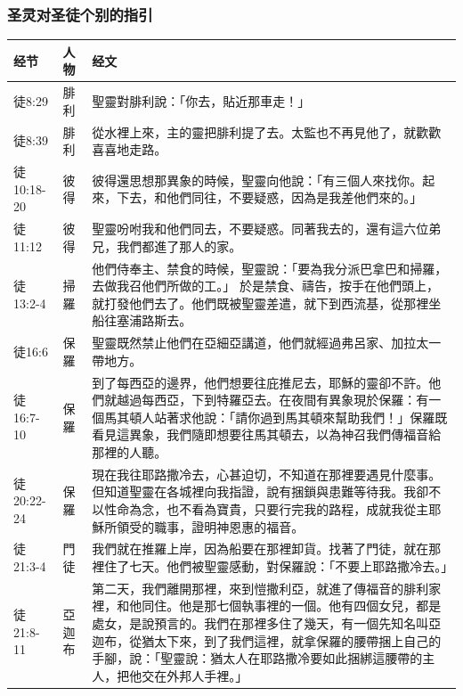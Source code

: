 \subsubsection{圣灵对圣徒个别的指引}
\begin{table}[H]
\centering
\begin{tabular}{p{5em}p{2.4em}p{40em}}  \toprule
经节&人物&经文 \\  \midrule
徒8:29&腓利&聖靈對腓利說：「你去，貼近那車走！」\\  \midrule
徒8:39&腓利&從水裡上來，主的靈把腓利提了去。太監也不再見他了，就歡歡喜喜地走路。\\  \midrule
徒10:18-20&彼得&彼得還思想那異象的時候，聖靈向他說：「有三個人來找你。起來，下去，和他們同往，不要疑惑，因為是我差他們來的。」\\  \midrule
徒11:12&彼得&聖靈吩咐我和他們同去，不要疑惑。同著我去的，還有這六位弟兄，我們都進了那人的家。\\  \midrule

徒13:2-4&掃羅&他們侍奉主、禁食的時候，聖靈說：「要為我分派巴拿巴和掃羅，去做我召他們所做的工。」 於是禁食、禱告，按手在他們頭上，就打發他們去了。他們既被聖靈差遣，就下到西流基，從那裡坐船往塞浦路斯去。\\  \midrule


徒16:6&保羅&聖靈既然禁止他們在亞細亞講道，他們就經過弗呂家、加拉太一帶地方。\\  \midrule
徒16:7-10&保羅&到了每西亞的邊界，他們想要往庇推尼去，耶穌的靈卻不許。他們就越過每西亞，下到特羅亞去。在夜間有異象現於保羅：有一個馬其頓人站著求他說：「請你過到馬其頓來幫助我們！」保羅既看見這異象，我們隨即想要往馬其頓去，以為神召我們傳福音給那裡的人聽。\\  \midrule


徒20:22-24&保羅&現在我往耶路撒冷去，心甚迫切，不知道在那裡要遇見什麼事。但知道聖靈在各城裡向我指證，說有捆鎖與患難等待我。我卻不以性命為念，也不看為寶貴，只要行完我的路程，成就我從主耶穌所領受的職事，證明神恩惠的福音。\\  \midrule
徒21:3-4&門徒&我們就在推羅上岸，因為船要在那裡卸貨。找著了門徒，就在那裡住了七天。他們被聖靈感動，對保羅說：「不要上耶路撒冷去。」\\  \midrule

徒21:8-11&亞迦布&第二天，我們離開那裡，來到愷撒利亞，就進了傳福音的腓利家裡，和他同住。他是那七個執事裡的一個。他有四個女兒，都是處女，是說預言的。我們在那裡多住了幾天，有一個先知名叫亞迦布，從猶太下來，到了我們這裡，就拿保羅的腰帶捆上自己的手腳，說：「聖靈說：猶太人在耶路撒冷要如此捆綁這腰帶的主人，把他交在外邦人手裡。」\\  \midrule

\end{tabular}%
\end{table}




